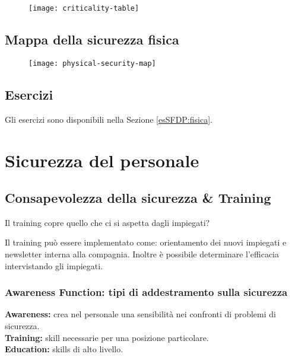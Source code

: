 \begin{figure}[H]
 \centering
 \texttt{[image: criticality-table]}
\end{figure}

\subsection{Mappa della sicurezza fisica}
\begin{figure}[H]
 \centering
 \texttt{[image: physical-security-map]}
\end{figure}

\subsection{Esercizi}

Gli esercizi sono disponibili nella Sezione \ref{esSFDP:fisica}.

\section{Sicurezza del personale}
\label{SFDP:DP}

\subsection{Consapevolezza della sicurezza \& Training}

Il training copre quello che ci si aspetta dagli impiegati?

Il training può essere implementato come: orientamento dei nuovi impiegati e
newsletter interna alla compagnia. Inoltre è possibile determinare l'efficacia
intervistando gli impiegati.


\subsubsection{Awareness Function: tipi di addestramento sulla sicurezza}

\textbf{Awareness:} crea nel personale una sensibilità nei confronti di problemi di
sicurezza.\\
\newline
\textbf{Training:} skill necessarie per una posizione particolare.\\
\newline
\textbf{Education:} skills di alto livello.\\

